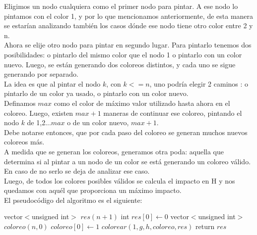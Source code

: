 \indent Eligimos un nodo cualquiera como el primer nodo para pintar. A ese nodo lo pintamos con el color 1, y por lo que mencionamos anteriormente, de esta manera se estarían analizando también los casos dónde ese nodo tiene otro color entre 2 y n.\\
\indent Ahora se elije otro nodo para pintar en segundo lugar. Para pintarlo tenemos dos posibilidades: o pintarlo del mismo color que el nodo 1 o pintarlo con un color nuevo. Luego, se están generando dos coloreos distintos, y cada uno se sigue generando por separado.\\
\indent La idea es que al pintar el nodo $k$, con $k<=n$, uno podría elegir 2 caminos : o pintarlo de un color ya usado, o pintarlo con un color nuevo.\\
\indent Definamos $max$ como el color de máximo valor utilizado hasta ahora en el coloreo. Luego, existen $max+1$ maneras de continuar ese coloreo, pintando el nodo $k$ de 1,2...$max$ o de un color nuevo, $max+1$.\\
\indent Debe notarse entonces, que por cada paso del coloreo se generan muchos nuevos coloreos más.\\
\indent A medida que se generan los coloreos, generamos otra poda: aquella que determina si al pintar a un nodo de un color se está generando un coloreo válido. En caso de no serlo se deja de analizar ese caso.\\
\indent Luego, de todos los colores posibles válidos se calcula el impacto en H y nos quedamos con aquél que proporciona un máximo impacto.\\

\indent El pseudocódigo del algoritmo es el siguiente:\\   





\begin{algorithm}[H]
\caption{} 
\begin{codebox}

\li vector$<$unsigned int$>$ $res(n+1)$
\li int $res[0] \gets 0$
\li vector$<$unsigned int$>$ $coloreo(n,0)$
\li $coloreo[0] \gets 1$
\li $colorear(1,g,h,coloreo,res)$
\li	return $res$
\End
\end{codebox}
\end{algorithm}



